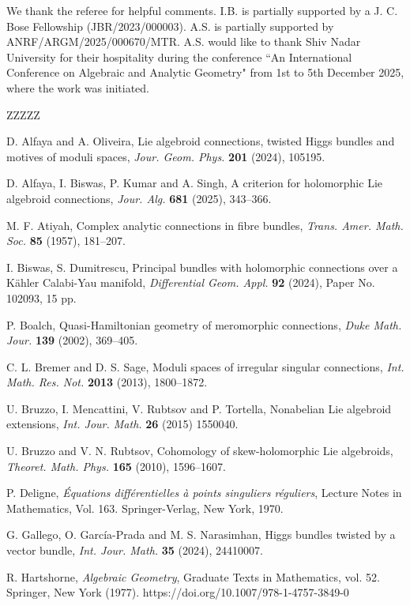 \documentclass[12pt,reqno]{amsart}
\numberwithin{equation}{section}
\theoremstyle{definition}
\begin{document}
We thank the referee for helpful comments.
I.B. is partially supported by a J. C. Bose Fellowship (JBR/2023/000003).
A.S. is partially supported by ANRF/ARGM/2025/000670/MTR.
A.S. would like to thank Shiv Nadar University for their hospitality during the conference ``An International Conference on Algebraic and Analytic Geometry" from 1st to 5th December 2025, where the work was initiated.

\begin{thebibliography}{ZZZZZ}

 D. Alfaya and A. Oliveira, Lie algebroid connections, twisted Higgs bundles
and motives of moduli spaces, {\it Jour. Geom. Phys.} {\bf 201} (2024), 105195.

 D. Alfaya, I. Biswas, P. Kumar and A. Singh, A criterion for holomorphic Lie algebroid 
connections, \textit{Jour. Alg.} {\bf 681} (2025), 343--366.

 M. F. Atiyah, Complex analytic connections in fibre bundles, {\it
Trans. Amer. Math. Soc.} {\bf 85} (1957), 181--207.

 I. Biswas, S. Dumitrescu, 
Principal bundles with holomorphic connections over a Kähler Calabi-Yau manifold, 
{\it Differential Geom. Appl. } {\bf 92} (2024), Paper No. 102093, 15 pp.

 P. Boalch, Quasi-Hamiltonian geometry of meromorphic connections, {\it Duke Math. Jour.} 
{\bf 139} (2002), 369--405.

 C. L. Bremer and D. S. Sage, Moduli spaces of irregular singular connections, {\it Int. 
Math. Res. Not.} {\bf 2013} (2013), 1800--1872.

 U. Bruzzo, I. Mencattini, V. Rubtsov and P. Tortella, Nonabelian Lie algebroid
extensions, {\it Int. Jour. Math.} {\bf 26} (2015) 1550040.

 U. Bruzzo and V. N. Rubtsov, Cohomology of skew-holomorphic Lie algebroids,
{\it Theoret. Math. Phys.} {\bf 165} (2010), 1596--1607.

 P. Deligne, {\it \'Equations diff\'erentielles \`a points singuliers r\'eguliers},
Lecture Notes in Mathematics, Vol. 163. Springer-Verlag, New York, 1970.

 G. Gallego, O. Garc\'ia-Prada and M. S. Narasimhan, Higgs bundles twisted by a vector bundle,
{\it Int. Jour. Math.} {\bf 35} (2024), 24410007.

 R. Hartshorne, {\it Algebraic Geometry}, Graduate Texts in Mathematics, vol. 52. Springer, New 
York (1977). https://doi.org/10.1007/978-1-4757-3849-0


\end{thebibliography}
\end{document}
